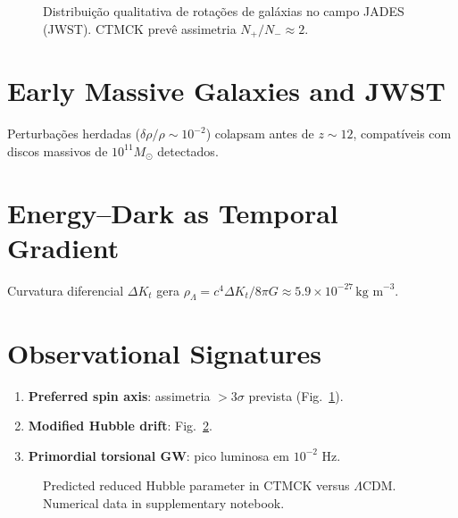 \documentclass[aps,prd,reprint,amsmath,amssymb,nofootinbib]{revtex4-2}
\begin{document}
\begin{figure}[h]
 \centering
 \caption{Distribuição qualitativa de rotações de galáxias no campo JADES (JWST). CTMCK prevê assimetria $N_{+}/N_{-}\approx2$.}
 \label{fig:spinJWST}
\end{figure}

\section{Early Massive Galaxies and JWST}\label{sec:jwst}
Perturbações herdadas ($\delta\rho/\rho\sim10^{-2}$) colapsam antes de $z\sim12$, compatíveis com discos massivos de $10^{11}M_{\odot}$ detectados.

\section{Energy--Dark as Temporal Gradient}\label{sec:darkenergy}
Curvatura diferencial $\Delta K_{t}$ gera $\rho_{\Lambda}=c^{4}\Delta K_{t}/8\pi G\approx5.9\times10^{-27}\,\text{kg m}^{-3}$.

\section{Observational Signatures}\label{sec:obs}
\begin{enumerate}
 \item \textbf{Preferred spin axis}: assimetria $>3\sigma$ prevista (Fig.~\ref{fig:spinJWST}).
 \item \textbf{Modified Hubble drift}: Fig.~\ref{fig:Hubble}.
 \item \textbf{Primordial torsional GW}: pico luminosa em $10^{-2}$ Hz.
\end{enumerate}

\begin{figure}[h]
 \centering
 \caption{Predicted reduced Hubble parameter in CTMCK versus $\Lambda$CDM. Numerical data in supplementary notebook.}
 \label{fig:Hubble}
\end{figure}
\end{document}
